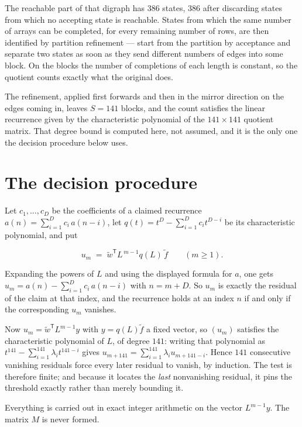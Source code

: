 \documentclass[11pt]{article}
\theoremstyle{definition}
\begin{document}
The reachable part of that digraph has $386$ states, $386$ after discarding states from which no accepting state is reachable. States from which the same number of arrays can be completed, for every remaining number of rows, are then identified by partition refinement --- start from the partition by acceptance and separate two states as soon as they send different numbers of edges into some block. On the blocks the number of completions of each length is constant, so the quotient counts exactly what the original does.

The refinement, applied first forwards and then in the mirror direction on the edges coming in, leaves $S = 141$ blocks, and the count satisfies the linear recurrence given by the characteristic polynomial of the $141 \times 141$ quotient matrix. That degree bound is computed here, not assumed, and it is the only one the decision procedure below uses.

\section{The decision procedure}

Let $c_1,\dots,c_D$ be the coefficients of a claimed recurrence $a(n) = \sum_{i=1}^{D} c_i\,a(n-i)$, let $q(t) = t^{D} - \sum_{i=1}^{D} c_i t^{D-i}$ be its characteristic polynomial, and put

\[u_m \;=\; \tilde w^{\mathsf T} L^{\,m-1} q(L)\,\tilde f \qquad (m \ge 1).\]

Expanding the powers of $L$ and using the displayed formula for $a$, one gets $u_m = a(n) - \sum_{i=1}^{D} c_i\,a(n-i)$ with $n = m + D$. So $u_m$ is exactly the residual of the claim at that index, and the recurrence holds at an index $n$ if and only if the corresponding $u_m$ vanishes.

Now $u_m = \tilde w^{\mathsf T} L^{m-1} y$ with $y = q(L)\tilde f$ a fixed vector, so $(u_m)$ satisfies the characteristic polynomial of $L$, of degree $141$: writing that polynomial as $t^{141} - \sum_{i=1}^{141} \lambda_i t^{141-i}$ gives $u_{m+141} = \sum_{i=1}^{141} \lambda_i u_{m+141-i}$. Hence $141$ consecutive vanishing residuals force every later residual to vanish, by induction. The test is therefore finite; and because it locates the {\itshape last} nonvanishing residual, it pins the threshold exactly rather than merely bounding it.

Everything is carried out in exact integer arithmetic on the vector $L^{m-1}y$. The matrix $M$ is never formed.
\end{document}
